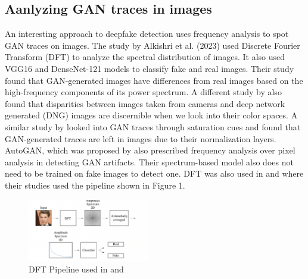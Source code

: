 \documentclass{icsthesis}
\begin{document}
\begin{mainmatter}
\subsection{Aanlyzing GAN traces in images}
An interesting approach to deepfake detection uses frequency analysis to spot GAN traces on images. The study by Alkishri et al. (2023) used Discrete Fourier Transform (DFT) to analyze the spectral distribution of images. It also used VGG16 and DenseNet-121 models to classify fake and real images. Their study found that GAN-generated images have differences from real images based on the high-frequency components of its power spectrum. A different study by \cite{dnn-color-components} also found that disparities between images taken from cameras and deep network generated (DNG) images are discernible when we look into their color spaces. A similar study by \cite{gan-saturation} looked into GAN traces through saturation cues and found that GAN-generated traces are left in images due to their normalization layers. AutoGAN, which was proposed by \cite{AutoGan} also prescribed frequency analysis over pixel analysis in detecting GAN artifacts. Their spectrum-based model also does not need to be trained on fake images to detect one. DFT was also used in \cite{unmasking} and \cite{deepfake-spatio} where their studies used the pipeline shown in Figure 1. 

\begin{figure}[ht]
    \begin{center}
    \vspace{4ex}
	\includegraphics[width=200px]{imgs/Screenshot 2023-12-29 at 12.45.10 AM.png}
    \caption{DFT Pipeline used in \cite{unmasking} and \cite{deepfake-spatio}}
    \label{fig:enter-label}
    \end{center}
\end{figure}



\end{mainmatter}
\end{document}
